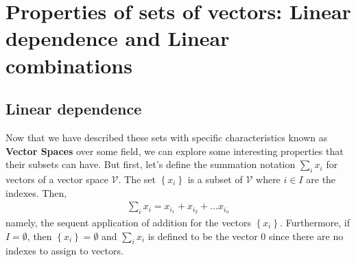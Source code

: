 \documentclass[12pt]{article}
\begin{document}
\section{Properties of sets of vectors: Linear dependence and Linear combinations}

\subsection{Linear dependence}

Now that we have described these sets with specific characteristics known as \textbf{Vector Spaces} over some field, we can explore some interesting properties that their subsets can have. But first, let's define the summation notation $\sum_{i} x_{i}$ for vectors of a vector space $\mathcal{V}$. The set $\left\{ x_{i} \right\}$ is a subset of $\mathcal{V}$ where $i\in I$ are the indexes. Then, 
\begin{align*}
  \sum_{i} x_{i} = x_{i_{1}} + x_{i_{2}} + \dots x_{i_{n}}
\end{align*}
namely, the sequent application of addition for the vectors $\left\{ x_{i} \right\}$. Furthermore, if $I = \emptyset$, then $\left\{ x_{i} \right\}= \emptyset$ and $\sum_{i}x_{i}$ is defined to be the vector $0$ since there are no indexes to assign to vectors.\\
\end{document}
